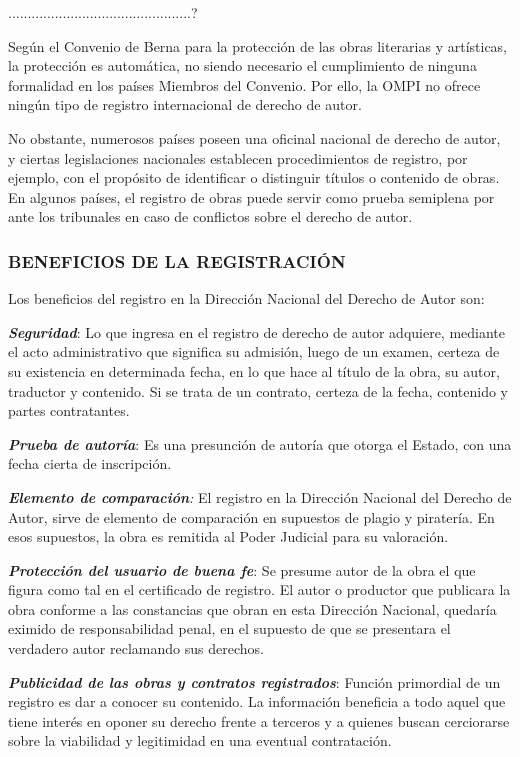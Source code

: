 ...............................................?

Según el Convenio de Berna para la protección de las obras literarias y artísticas, la protección es automática, no siendo necesario el cumplimiento de ninguna formalidad en los países Miembros del Convenio. Por ello, la OMPI no ofrece ningún tipo de registro internacional de derecho de autor.

No obstante, numerosos países poseen una oficinal nacional de derecho de autor, y ciertas legislaciones nacionales establecen procedimientos de registro, por ejemplo, con el propósito de identificar o distinguir títulos o contenido de obras. En algunos países, el registro de obras puede servir como prueba semiplena por ante los tribunales en caso de conflictos sobre el derecho de autor.

\subsubsection*{BENEFICIOS DE LA REGISTRACIÓN}
Los beneficios del registro en la Dirección Nacional del Derecho de Autor son:

\textbf{\textit{Seguridad}}: Lo que ingresa en el registro de derecho de autor adquiere, mediante el acto administrativo que significa su admisión, luego de un examen, certeza de su existencia en determinada fecha, en lo que hace al título de la obra, su autor, traductor y contenido. Si se trata de un contrato, certeza de la fecha, contenido y partes contratantes.

\textbf{\textit{Prueba de autoría}}: Es una presunción de autoría que otorga el Estado, con una fecha cierta de inscripción.

\textbf{\textit{Elemento de comparación}}\textit{: }El registro en la Dirección Nacional del Derecho de Autor, sirve de elemento de comparación en supuestos de plagio y piratería. En esos supuestos, la obra es remitida al Poder Judicial para su valoración.

\textbf{\textit{Protección del usuario de buena fe}}: Se presume autor de la obra el que figura como tal en el certificado de registro. El autor o productor que publicara la obra conforme a las constancias que obran en esta Dirección Nacional, quedaría eximido de responsabilidad penal, en el supuesto de que se presentara el verdadero autor reclamando sus derechos.

\textbf{\textit{Publicidad de las obras y contratos registrados}}: Función primordial de un registro es dar a conocer su contenido. La información beneficia a todo aquel que tiene interés en oponer su derecho frente a terceros y a quienes buscan cerciorarse sobre la viabilidad y legitimidad en una eventual contratación.

